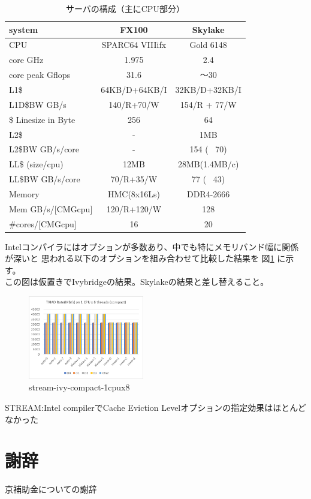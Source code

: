 \documentclass[submit,techrep,noauthor]{ipsj}
\begin{document}
\begin{table}[tb]
\caption{サーバの構成（主にCPU部分）}
\label{tab:server-config}
\footnotesize
\begin{tabular}{l|c|c} \hline
system	&	FX100	&	Skylake	\\ \hline
CPU	&	SPARC64 VIIIifx	&	Gold 6148	\\ \hline
core GHz	&	1.975	&	2.4	\\ \hline
core peak Gflops	&	31.6	&	〜30	\\ \hline
L1\$	&	64KB/D+64KB/I	&	32KB/D+32KB/I	\\ \hline
L1D\$BW GB/s	&	140/R+70/W	&	154/R + 77/W	\\ \hline
\$ Linesize in Byte	&	256	&	64	\\ \hline
L2\$	&	-	&	1MB	\\ \hline
L2\$BW GB/s/core	&	-	&	154 ( ~70)	\\ \hline
LL\$ (size/cpu)	&	12MB	&	28MB(1.4MB/c)	\\ \hline
LL\$BW GB/s/core	&	70/R+35/W	&	77 ( ~43)	\\ \hline
Memory	&	HMC(8x16Ls)	&	DDR4-2666	\\ \hline
Mem GB/s/[CMGcpu]	&	120/R+120/W	&	128	\\ \hline
\#cores/[CMGcpu]	&	16	&	20	\\ \hline
\end{tabular}
\end{table}


Intelコンパイラにはオプションが多数あり、中でも特にメモリバンド幅に関係が深いと
思われる以下のオプションを組み合わせて比較した結果を
図\ref{fig:stream-ivy-compact-1cpux8} に示す。\\
{\color{BLUE}この図は仮置きでIvybridgeの結果。Skylakeの結果と差し替えること。}

\begin{figure}[tb]
\centering\includegraphics[width=0.45\textwidth]{figs/stream-ivy-compact-1cpux8.png}
\caption{stream-ivy-compact-1cpux8}
  \label{fig:stream-ivy-compact-1cpux8}
\end{figure}

{ \color{BLUE}
STREAM:Intel compilerでCache Eviction Levelオプションの指定効果はほとんど
なかった\\
}



\section{謝辞}

京補助金についての謝辞



\end{document}
